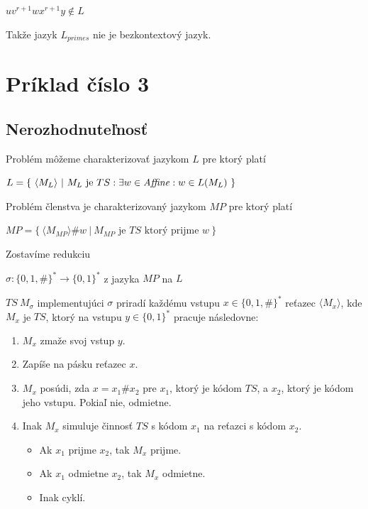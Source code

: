 \documentclass[11pt,a4paper]{article}
\begin{document}
\begin{center}
$uv^{r+1}wx^{r+1}y \notin L$
\end{center}

Takže jazyk $L_{primes}$ nie je bezkontextový jazyk.

\newpage
\section{Príklad číslo 3} %

\subsection{Nerozhodnuteľnosť}

Problém môžeme charakterizovať jazykom $L$ pre ktorý platí

\begin{center}
    $L = \{ \ \langle M_{L} \rangle \ | \ M_{L} \text{ je } TS: \exists w \in \text{\textit{Affine}}: w \in L(M_{L}) \ \}$
\end{center}

Problém členstva je charakterizovaný jazykom $MP$ pre ktorý platí

\begin{center}
    $MP = \{ \ \langle M_{MP} \rangle \# w  \ | \ M_{MP} \text{ je } TS \text{ ktorý prijme } w \ \}$
\end{center}

Zostavíme redukciu

\begin{center}
    $\sigma: \{0,1,\#\}^{*} \longrightarrow \{0,1\}^{*}$ z jazyka $MP$ na $L$
\end{center}

$TS \ M_{\sigma}$ implementujúci $\sigma$ priradí každému vstupu $x \in \{0,1,\#\}^{*}$ reťazec $\langle M_{x} \rangle$, kde $M_{x}$ je $TS$, ktorý na vstupu $y \in \{0,1\}^{*}$ pracuje následovne:

\begin{enumerate}
    \item $M_{x}$ zmaže svoj vstup $y$.
    \item Zapíše na pásku reťazec $x$.
    \item $M_{x}$ posúdi, zda $x=x_{1}\#x_{2}$ pre $x_1$, ktorý je kódom $TS$, a $x_2$, ktorý je kódom jeho vstupu. Pokiaľ nie, odmietne.
    \item Inak $M_{x}$ simuluje činnosť $TS$ s kódom $x_1$ na reťazci s kódom $x_2$.
        \begin{itemize}
            \item Ak $x_1$ prijme $x_2$, tak $M_x$ prijme.
            \item Ak $x_1$ odmietne $x_2$, tak $M_x$ odmietne.
            \item Inak cyklí.
        \end{itemize}
\end{enumerate}
\end{document}
